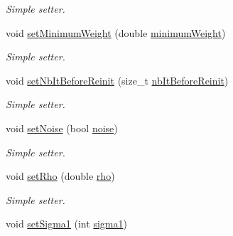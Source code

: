 \begin{DoxyCompactItemize}
\begin{DoxyCompactList}\small\item\em Simple setter. \end{DoxyCompactList}\item 
\hypertarget{classALNS__Parameters_ad7f204195478c171c0f29ef237cf5470}{void \hyperlink{classALNS__Parameters_ad7f204195478c171c0f29ef237cf5470}{set\-Minimum\-Weight} (double \hyperlink{classALNS__Parameters_a43836684feb26f2dd6d44f57bc4d8c52}{minimum\-Weight})}\label{classALNS__Parameters_ad7f204195478c171c0f29ef237cf5470}

\begin{DoxyCompactList}\small\item\em Simple setter. \end{DoxyCompactList}\item 
\hypertarget{classALNS__Parameters_a59a36cf16766df312312247ad3216e41}{void \hyperlink{classALNS__Parameters_a59a36cf16766df312312247ad3216e41}{set\-Nb\-It\-Before\-Reinit} (size\-\_\-t \hyperlink{classALNS__Parameters_a71f14dea13400809264b6d80601e0bdd}{nb\-It\-Before\-Reinit})}\label{classALNS__Parameters_a59a36cf16766df312312247ad3216e41}

\begin{DoxyCompactList}\small\item\em Simple setter. \end{DoxyCompactList}\item 
\hypertarget{classALNS__Parameters_a8ffdf8ac54116ac5c6243a6de6baddc3}{void \hyperlink{classALNS__Parameters_a8ffdf8ac54116ac5c6243a6de6baddc3}{set\-Noise} (bool \hyperlink{classALNS__Parameters_a11b8be72f937debc3751320734db0175}{noise})}\label{classALNS__Parameters_a8ffdf8ac54116ac5c6243a6de6baddc3}

\begin{DoxyCompactList}\small\item\em Simple setter. \end{DoxyCompactList}\item 
\hypertarget{classALNS__Parameters_a1ab558c6c326f18a333db905143e93ee}{void \hyperlink{classALNS__Parameters_a1ab558c6c326f18a333db905143e93ee}{set\-Rho} (double \hyperlink{classALNS__Parameters_a4bf8967ee96b03fe872daf5da1a23782}{rho})}\label{classALNS__Parameters_a1ab558c6c326f18a333db905143e93ee}

\begin{DoxyCompactList}\small\item\em Simple setter. \end{DoxyCompactList}\item 
\hypertarget{classALNS__Parameters_ae9cbb7031b716d71fccae45a93e01387}{void \hyperlink{classALNS__Parameters_ae9cbb7031b716d71fccae45a93e01387}{set\-Sigma1} (int \hyperlink{classALNS__Parameters_a71cea2ded56ca74871a5d434e03b30f4}{sigma1})}\label{classALNS__Parameters_ae9cbb7031b716d71fccae45a93e01387}


\end{DoxyCompactItemize}
